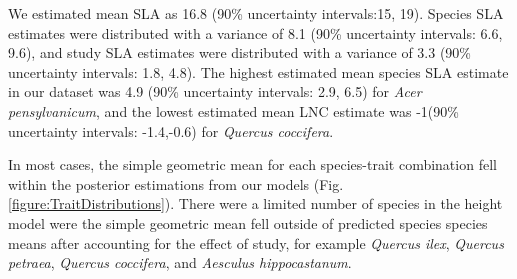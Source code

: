 \documentclass{article}\usepackage[]{graphicx}\usepackage[]{color}
\begin{document}
We estimated mean SLA as 16.8 (90\% uncertainty intervals:15, 19). Species SLA estimates were distributed with a variance of 8.1 (90\% uncertainty intervals: 6.6, 9.6), and study SLA estimates were distributed with a variance of 3.3 (90\% uncertainty intervals: 1.8, 4.8). The highest estimated mean species SLA estimate in our dataset was 4.9 (90\% uncertainty intervals: 2.9, 6.5) for \textit{Acer pensylvanicum}, and the lowest estimated mean LNC estimate was -1(90\% uncertainty intervals: -1.4,-0.6) for \textit{Quercus coccifera}.

In most cases, the simple geometric mean for each species-trait combination fell within the posterior estimations from our models (Fig. \ref{figure:TraitDistributions}). There were a limited number of species in the height model were the simple geometric mean fell outside of predicted species species means after accounting for the effect of study, for example \textit{Quercus ilex}, \textit{Quercus petraea}, \textit{Quercus coccifera}, and \textit{Aesculus hippocastanum}.


\end{document}
